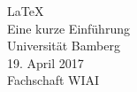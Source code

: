\begin{center}
\Huge \LaTeX\\
\vspace{5mm} \LARGE Eine kurze Einführung\\
\vspace{12mm} \Large  Universität Bamberg\\[5mm]
\large 19. April 2017\\ 
Fachschaft WIAI\normalsize \\
\end{center}
